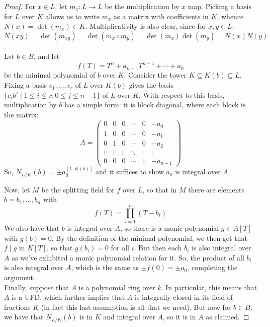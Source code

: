 \begin{proof}
	For $x \in L$, let $m_x : L \to L$ be the multiplication by $x$ map. Picking a basis for $L$ over $K$ allows us to write $m_x$ as a matrix with coefficients in $K$, whence $N(x) = \det(m_x) \in K$. Multiplicativity is also clear, since for $x,y \in L$: $N(xy) = \det(m_{xy}) = \det(m_x \circ m_y) = \det(m_x)\det(m_y) = N(x)N(y)$. \\
	
	Let $b \in B$, and let
	\[ f(T) = T^n + a_{n-1}T^{n-1} + \cdots + a_0 \]
	be the minimal polynomial of $b$ over $K$. Consider the tower $K \subseteq K(b) \subseteq L$. Fixing a basis $c_1,\ldots,c_r$ of $L$ over $K(b)$ gives the basis $\{c_ib^j \mid 1 \leq i \leq r, 0 \leq j \leq n-1 \}$ of $L$ over $K$. With respect to this basis, multiplication by $b$ has a simple form: it is block diagonal, where each block is the matrix:
	\[ A = \left(\begin{array}{cccccc} 0 & 0 & 0 & \cdots & 0 & -a_0 \\ 1 & 0 & 0 & \cdots & 0 & -a_1 \\ 0 & 1 & 0 & \cdots & 0 & -a_2 \\ \vdots & \vdots & \vdots & \ddots & \vdots & \vdots \\ 0 & 0 & 0 & \cdots & 1 & -a_{n-1} \end{array}\right) \]
	So, $N_{L/K}(b) = \pm a_0^{[L:K(b)]}$ and it suffices to show $a_0$ is integral over $A$.
	
	Now, let $M$ be the splitting field for $f$ over $L$, so that in $M$ there are elements $b = b_1,\ldots,b_n$ with
	\[ f(T) = \prod_{i=1}^n (T-b_i) \]
	We also have that $b$ is integral over $A$, so there is a monic polynomial $g \in A[T]$ with $g(b) = 0$. By the definition of the minimal polynomial, we then get that $f \mid g$ in $K[T]$, so that $g(b_i) = 0$ for all $i$. But then each $b_i$ is also integral over $A$ as we've exhibited a monic polynomial relation for it. So, the product of all $b_i$ is also integral over $A$, which is the same as $\pm f(0) = \pm a_0$, completing the argument. \\
	
	Finally, suppose that $A$ is a polynomial ring over $k$. In particular, this means that $A$ is a UFD, which further implies that $A$ is integrally closed in its field of fractions $K$ (in fact this last assumption is all that we need). But now for $b \in B$, we have that $N_{L/K}(b)$ is in $K$ and integral over $A$, so it is in $A$ as claimed.
\end{proof}
